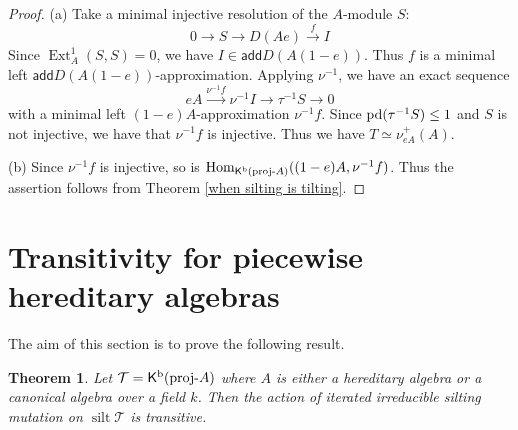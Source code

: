 \documentclass[a4paper,reqno]{amsart}
\newtheorem{theorem}{Theorem}[section]
\theoremstyle{definition}
\newtheorem{example}[theorem]{Example}
\newcommand{\TT}{{\mathcal T}}
\newcommand{\add}{\mathsf{add}}
\newcommand{\Hom}{\operatorname{Hom}\nolimits}
\newcommand{\silt}{\operatorname{silt}\nolimits}
\newcommand{\proj}[1]{{\rm{proj}}\text{-}#1} %
\newcommand{\K}{\mathsf{K}}
\newcommand{\Ext}{\operatorname{Ext}\nolimits}
\begin{document}
\begin{proof}
(a) Take a minimal injective resolution of the $A$-module $S$:
\[0\longrightarrow S\longrightarrow D(Ae)\stackrel{f}{\longrightarrow}I\]
Since $\Ext^1_A(S,S)=0$, we have $I\in\add{D(A(1-e))}$.
Thus $f$ is a minimal left $\add{D(A(1-e))}$-approximation.
Applying $\nu^{-1}$, we have an exact sequence
\[eA\xrightarrow{\nu^{-1}f}\nu^{-1}I\longrightarrow\tau^{-1}S\longrightarrow0\]
with a minimal left $(1-e)A$-approximation $\nu^{-1}f$.
Since ${\rm{pd}}(\tau^{-1}S)\leq 1$ and $S$ is not injective, we have that $\nu^{-1}f$ is injective. 
Thus we have $T\simeq\nu_{eA}^+(A)$.

(b) Since $\nu^{-1}f$ is injective, so is $\Hom_{\K^{\rm{b}}(\proj{A})}((1-e)A,\nu^{-1}f)$.
Thus the assertion follows from Theorem \ref{when silting is tilting}.
\end{proof}




\section{Transitivity for piecewise hereditary algebras}

The aim of this section is to prove the following result.

\begin{theorem}\label{hereditary case}
Let $\TT=\K^{\rm b}(\proj{A})$ where $A$ is either a hereditary algebra or a canonical algebra over a field $k$.
Then the action of iterated irreducible silting mutation on $\silt\TT$ is transitive.
\end{theorem}
\end{document}
